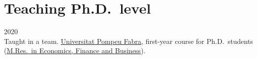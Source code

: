 \section*{Teaching \small{Ph.D.\ level}}

\begin{paracol}{2}
    \textsc{2020}
  \switchcolumn
    \\
    Taught in a team.
    \href{https://www.upf.edu/}{Universitat Pompeu Fabra}, first-year course for Ph.D.\ students (\href{https://www.upf.edu/web/econ/mres-i-phd}{M.Res.\ in Economics, Finance and Business}).
\end{paracol}